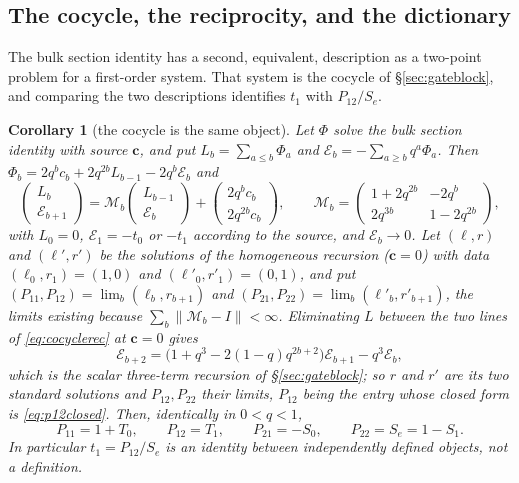 \documentclass[11pt]{article}
\theoremstyle{plain}
\newtheorem{corollary}[theorem]{Corollary}
\theoremstyle{definition}
\theoremstyle{remark}
\begin{document}
\subsection{The cocycle, the reciprocity, and the dictionary}\label{sec:cocycleid}

The bulk section identity has a second, equivalent, description as a two-point problem for a
first-order system. That system is the cocycle of \S\ref{sec:gateblock}, and comparing the two
descriptions identifies $t_1$ with $P_{12}/S_e$.

\begin{corollary}[the cocycle is the same object]\label{cor:cocycle}
Let $\Phi$ solve the bulk section identity with source $\mathbf c$, and put
$L_b=\sum_{a\le b}\Phi_a$ and $\mathcal E_b=-\sum_{a\ge b}q^a\Phi_a$. Then
$\Phi_b=2q^bc_b+2q^{2b}L_{b-1}-2q^b\mathcal E_b$ and
\begin{equation}\label{eq:cocyclerec}
  \begin{pmatrix}L_b\\ \mathcal E_{b+1}\end{pmatrix}
  =\mathcal M_b\begin{pmatrix}L_{b-1}\\ \mathcal E_{b}\end{pmatrix}
   +\begin{pmatrix}2q^{b}c_b\\ 2q^{2b}c_b\end{pmatrix},\qquad
  \mathcal M_b=\begin{pmatrix}1+2q^{2b}&-2q^{b}\\ 2q^{3b}&1-2q^{2b}\end{pmatrix},
\end{equation}
with $L_0=0$, $\mathcal E_1=-t_0$ or $-t_1$ according to the source, and $\mathcal E_b\to0$. Let
$(\ell,r)$ and $(\ell',r')$ be the solutions of the homogeneous recursion
\textup{(}$\mathbf c=0$\textup{)} with data $(\ell_0,r_1)=(1,0)$ and $(\ell'_0,r'_1)=(0,1)$, and
put $(P_{11},P_{12})=\lim_b(\ell_b,r_{b+1})$ and $(P_{21},P_{22})=\lim_b(\ell'_b,r'_{b+1})$, the
limits existing because $\sum_b\|\mathcal M_b-I\|<\infty$. Eliminating $L$ between the two lines
of \eqref{eq:cocyclerec} at $\mathbf c=0$ gives
\[
   \mathcal E_{b+2}=\bigl(1+q^3-2(1-q)q^{2b+2}\bigr)\mathcal E_{b+1}-q^3\mathcal E_b ,
\]
which is the scalar three-term recursion of \S\ref{sec:gateblock}; so $r$ and $r'$ are its two
standard solutions and $P_{12},P_{22}$ their limits, $P_{12}$ being the entry whose closed form is
\eqref{eq:p12closed}. Then, identically in $0<q<1$,
\[
   P_{11}=1+T_0,\qquad P_{12}=T_1,\qquad P_{21}=-S_0,\qquad P_{22}=S_e=1-S_1 .
\]
In particular $t_1=P_{12}/S_e$ is an identity between independently defined objects, not a
definition.
\end{corollary}
\end{document}
